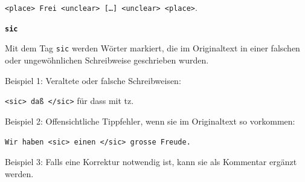 \documentclass[12pt, a4paper, ngerman, bidi=default]{article}
\newcommand{\code}[1]{\colorbox{VeryLightGray}{\texttt{#1}}} %
\begin{document}
\begin{description}
    \code{<place>~Frei~<unclear>~[\ldots]~<unclear>~<place>}.

    
    \item\texttt{\textbf{{\colorbox{sic}{sic}}}} 

    Mit dem Tag \texttt{sic} werden Wörter markiert, die im Originaltext in einer falschen oder ungewöhnlichen Schreibweise geschrieben wurden.

    \noindent{} Beispiel 1: Veraltete oder falsche Schreibweisen: 

    \code{<sic>~daß~</sic>} für dass mit tz.

     Beispiel 2: Offensichtliche Tippfehler, wenn sie im Originaltext so vorkommen: 

    \code{Wir haben {<sic>~einen~</sic>} grosse Freude.}

     Beispiel 3: Falls eine Korrektur notwendig ist, kann sie als Kommentar ergänzt werden. 

    \end{description}
    \endgroup
\end{document}
